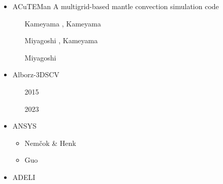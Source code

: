 \begin{itemize}
\item {\codefont ACuTEMan} 
A multigrid-based mantle convection simulation code

\begin{scriptsize}
\begin{itemize}
\item[\twothousandfive] Kameyama \cite{kame05}, Kameyama \etal \cite{kaks05}
\item[\twothousandfifteen] Miyagoshi \etal \cite{miko15}, Kameyama \etal \cite{kamo15}
\item[\twothousandtwenty] Miyagoshi \etal \cite{miko20} 
\end{itemize}
\end{scriptsize}

\item {\codefont Alborz-3DSCV} 

\begin{scriptsize}
\begin{itemize}
\item[2015] \textcite{shpe15} 
\item[2023] \textcite{shpy23}
\end{itemize}
\end{scriptsize}


\item {\codefont ANSYS} 

\begin{scriptsize}
\begin{itemize}
\item Nem{\v{c}}ok \& Henk \cite{nehe06}
\item Guo \etal \cite{guyr16}
\end{itemize}
\end{scriptsize}

\item {\codefont ADELI} 


\end{itemize}
